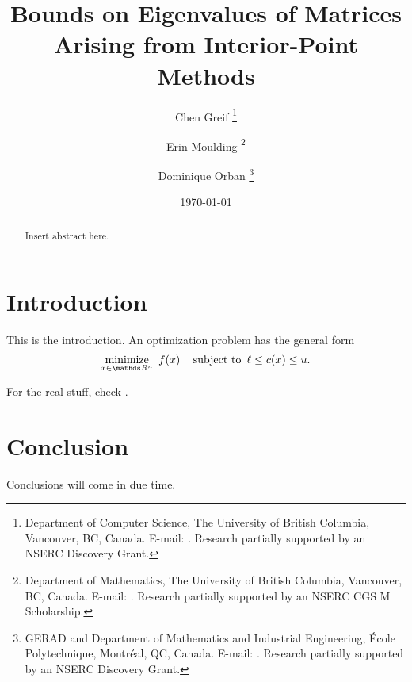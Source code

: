 \documentclass[review]{siamart0216}   %
\title{
  Bounds on Eigenvalues of Matrices Arising from Interior-Point Methods%
}
\author{
  Chen Greif%
  \thanks{%
    Department of Computer Science,
    The University of British Columbia,
    Vancouver, BC, Canada.
    E-mail: \mailto{greif@cs.ubc.ca}.
    Research partially supported by an NSERC Discovery Grant.
  }
  \and
  Erin Moulding%
  \thanks{%
    Department of Mathematics,
    The University of British Columbia,
    Vancouver, BC, Canada.
    E-mail: \mailto{moulding@math.ubc.ca}.
    Research partially supported by an NSERC CGS M Scholarship.
  }
  \and
  Dominique Orban%
  \thanks{%
    GERAD and Department of Mathematics and Industrial Engineering,
    \'Ecole Polytechnique, Montr\'eal, QC, Canada.
    E-mail: \mailto{dominique.orban@gerad.ca}.
    Research partially supported by an NSERC Discovery Grant.
  }
}
\date{\today}
\begin{document}
  \linenumbers
  \maketitle

  \thispagestyle{firstpage}
  \pagestyle{myheadings}

  \begin{abstract}
    Insert abstract here. 
  \end{abstract}

  \tableofcontents
  \listoftodos\relax

  \section{Introduction}

  This is the introduction. An optimization problem has the general form
  \begin{equation}
    \label{eq:opt-problem}
    \minimize{x \in \R^n} \ f(x) \quad \st \ \ell \leq c(x) \leq u.
  \end{equation}

  For the real stuff, check \cite{wright-orban-2002}.

  \section{Conclusion}

  Conclusions will come in due time. 

  
  
\end{document}
